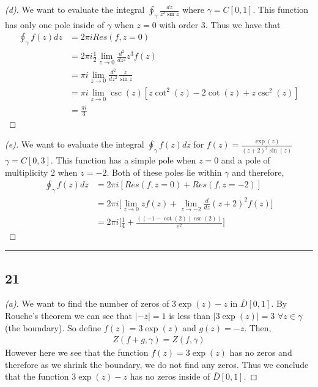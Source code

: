 \documentclass[a4paper, 11pt]{article}
\begin{document}
	\begin{proof}[(d)]
		We want to evaluate the integral $\oint_\gamma \frac{dz}{z^2\sin z}$ where $\gamma = C[0,1]$. This function has only one pole inside of $\gamma$ when $z=0$ with order 3. Thus we have that 
			\begin{align*}
				\oint_\gamma f(z) dz &= 2\pi i Res(f, z=0) \\ 
					&= 2\pi i \frac{1}{2}\lim_{z\to 0}\frac{d^2}{dz^2}z^3f(z) \\ 
					&=\pi i \lim_{z\to 0} \frac{d^2}{dz^2} \frac{z}{\sin z} \\ 
					&= \pi i \lim_{z\to 0} \csc(z)[z\cot^2(z)-2\cot(z)+z\csc^2(z)] \\
					&= \frac{\pi i}{3}
			\end{align*}
	\end{proof}
	
	\begin{proof}[(e)]
		We want to evaluate the integral $\oint_\gamma f(z)dz$ for $f(z) = \frac{\exp(z)}{(z+2)^2\sin(z)}$ $\gamma = C[0,3]$. This function has a simple pole when $z=0$ and a pole of multiplicity 2 when $z=-2$. Both of these poles lie within $\gamma$ and therefore, 
			\begin{align*}
				\oint_\gamma f(z)dz &= 2\pi i [Res(f, z=0)+Res(f, z=-2)] \\ 
					&= 2\pi i \Big[ \lim_{z\to0}zf(z) + \lim_{z\to -2}\frac{d}{dz}(z+2)^2f(z)  \Big] \\ 
					&= 2\pi i \Big[ \frac{1}{4} + \frac{((-1 - \cot(2))\csc(2))}{e^2} \Big]
			\end{align*}
	\end{proof}
	
	
\par\noindent\rule{\textwidth}{0.4pt}
\subsection*{21}
	\begin{proof}[(a)]
		We want to find the number of zeros of $3\exp(z)-z$ in $\overline{D}[0,1]$. By Rouche's theorem we can see that $|-z| = 1$ is less than $|3\exp(z)|=3$ $\forall z \in \gamma$ (the boundary). So define $f(z) = 3\exp(z)$ and $g(z) = -z$. Then, 
			\begin{align*}
				Z(f+g, \gamma) = Z(f, \gamma)
			\end{align*} 
		However here we see that the function $f(z)=3\exp(z)$ has no zeros and therefore as we shrink the boundary, we do not find any zeros. Thus we conclude that the function $3\exp(z)-z$ has no zeros inside of $\overline{D}[0,1]$. 
	\end{proof}
	
\end{document}
